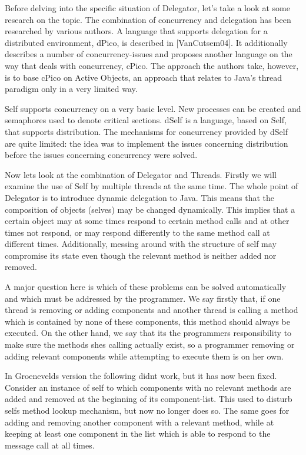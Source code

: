 \documentclass[a4paper,12pt]{book}
\begin{document}
Before delving into the specific situation of Delegator, let's take a look at some research on the topic. The combination of concurrency and delegation has been researched by various authors. A language that supports delegation for a distributed environment, dPico, is described in [VanCutsem04]. It additionally describes a number of concurrency-issues and proposes another language on the way that deals with concurrency, cPico. The approach the authors take, however, is to base cPico on Active Objects, an approach that relates to Java's thread paradigm only in a very limited way.

Self supports concurrency on a very basic level. New processes can be created and semaphores used to denote critical sections. dSelf is a language, based on Self, that supports distribution. The mechanisms for concurrency provided by dSelf are quite limited: the idea was to implement the issues concerning distribution before the issues concerning concurrency were solved.

Now lets look at the combination of Delegator and Threads. Firstly we will examine the use of Self by multiple threads at the same time. The whole point of Delegator is to introduce dynamic delegation to Java. This means that the composition of objects (selves) may be changed dynamically. This implies that a certain object may at some times respond to certain method calls and at other times not respond, or may respond differently to the same method call at different times. Additionally, messing around with the structure of self may compromise its state even though the relevant method is neither added nor removed.

A major question here is which of these problems can be solved automatically and which must be addressed by the programmer. We say firstly that, if one thread is removing or adding components and another thread is calling a method which is contained by none of these components, this method should always be executed. On the other hand, we say that its the programmers responsibility to make sure the methods shes calling actually exist, so a programmer removing or adding relevant components while attempting to execute them is on her own.

In Groenevelds version the following didnt work, but it has now been fixed. Consider an instance of self to which components with no relevant methods are added and removed at the beginning of its component-list. This used to disturb selfs method lookup mechanism, but now no longer does so. The same goes for adding and removing another component with a relevant method, while at keeping at least one component in the list which is able to respond to the message call at all times.
\end{document}
